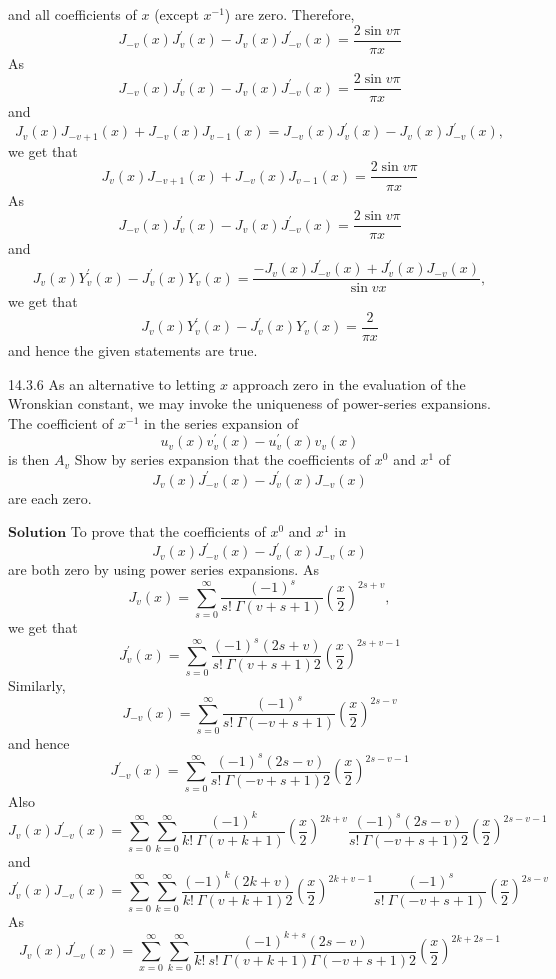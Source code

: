 \documentclass{article}
\begin{document}
\begin{flushleft}
and all coefficients of $x$ (except $x^{-1}$) are zero. Therefore, 
$$J_{-v}(x) J_{v}^{\prime}(x)-J_{v}(x) J_{-v}^{\prime}(x)=\frac{2 \sin v \pi}{\pi x}$$
As 
$$J_{-v}(x) J_{v}^{\prime}(x)-J_{v}(x) J_{-v}^{\prime}(x)=\frac{2 \sin v \pi}{\pi x}$$ 
and
$$J_{v}(x) J_{-v+1}(x)+J_{-v}(x) J_{v-1}(x)=J_{-v}(x) J_{v}^{\prime}(x)-J_{v}(x) J_{-v}^{\prime}(x),$$ 
we get that
$$J_{v}(x) J_{-v+1}(x)+J_{-v}(x) J_{v-1}(x)=\frac{2 \sin v \pi}{\pi x}$$
As 
$$J_{-v}(x) J_{v}^{\prime}(x)-J_{v}(x) J_{-v}^{\prime}(x)=\frac{2 \sin v \pi}{\pi x}$$ 
and
$$J_{v}(x) Y_{v}^{\prime}(x)-J_{v}^{\prime}(x) Y_{v}(x)=\frac{-J_{v}(x) J_{-v}^{\prime}(x)+J_{v}^{\prime}(x) J_{-v}(x)}{\sin v x},$$ 
we get that
$$J_{v}(x) Y_{v}^{\prime}(x)-J_{v}^{\prime}(x) Y_{v}(x)=\frac{2}{\pi x}$$ 
and hence the given statements are true.
\newpage


\begin{mybox}{14.3.6}
As an alternative to letting $x$ approach zero in the evaluation of the Wronskian constant, we may invoke the uniqueness of power-series expansions. The coefficient of $x^{-1}$ in the series expansion of 
$$u_{v}(x) v_{v}^{\prime}(x)-u_{v}^{\prime}(x) v_{v}(x)$$ is then $A_{v}$  
Show by series expansion that the coefficients of $x^{0}$ and $x^{1}$ of 
$$J_{v}(x) J_{-v}^{\prime}(x)-J_{v}^{\prime}(x) J_{-v}(x)$$ 
are each zero.
\end{mybox}
$\boxed{\textbf{Solution}}$ To prove that the coefficients of $x^{0}$ and $x^{1}$ in 
$$J_{v}(x) J_{-v}^{\prime}(x)-J_{v}^{\prime}(x) J_{-v}(x)$$ 
are both zero by using power series expansions. As 
$$J_{v}(x)=\sum_{s=0}^{\infty} \frac{(-1)^{s}}{s ! \  \Gamma(v+s+1)}\left(\frac{x}{2}\right)^{2 s+v},$$
we get that 
$$J_{v}^{\prime}(x)=\sum_{s=0}^{\infty} \frac{(-1)^{s}(2 s+v)}{s ! \  \Gamma(v+s+1) 2}\left(\frac{x}{2}\right)^{2 s+v-1}$$
Similarly, 
$$J_{-v}(x)=\sum_{s=0}^{\infty} \frac{(-1)^{s}}{s ! \  \Gamma(-v+s+1)}\left(\frac{x}{2}\right)^{2 s-v}$$
and hence
$$J_{-v}^{\prime}(x)=\sum_{s=0}^{\infty} \frac{(-1)^{s}(2 s-v)}{s ! \  \Gamma(-v+s+1) 2}\left(\frac{x}{2}\right)^{2 s-v-1}$$
Also 
$$J_{v}(x) J_{-v}^{\prime}(x)=\sum_{s=0}^{\infty} \sum_{k=0}^{\infty} \frac{(-1)^{k}}{k ! \  \Gamma(v+k+1)}\left(\frac{x}{2}\right)^{2 k+v} \frac{(-1)^{s}(2 s-v)}{s ! \  \Gamma(-v+s+1) 2}\left(\frac{x}{2}\right)^{2 s-v-1}$$ 
and
$$J_{v}^{\prime}(x) J_{-v}(x)=\sum_{s=0}^{\infty} \sum_{k=0}^{\infty} \frac{(-1)^{k}(2 k+v)}{k ! \  \Gamma(v+k+1) 2}\left(\frac{x}{2}\right)^{2 k+v-1} \frac{(-1)^{s}}{s ! \  \Gamma(-v+s+1)}\left(\frac{x}{2}\right)^{2 s-v}$$
As 
$$J_{v}(x) J_{-v}^{\prime}(x)=\sum_{x=0}^{\infty} \sum_{k=0}^{\infty} \frac{(-1)^{k+s}(2 s-v)}{k ! \  s ! \  \Gamma(v+k+1) \Gamma(-v+s+1) 2}\left(\frac{x}{2}\right)^{2 k+2 s-1}$$ 

\end{flushleft}
\end{document}
